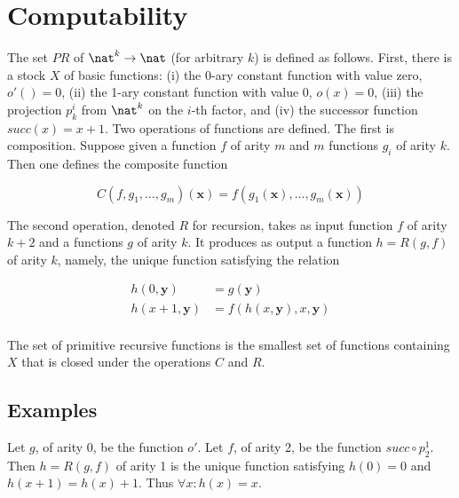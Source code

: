 
\section{Computability}

The set $PR$ of  $\nat^k \to \nat$ (for arbitrary $k$) is defined as follows.  First, there is a stock $X$ of basic functions: (i) the 0-ary constant function with value zero, $o'() = 0$, (ii) the 1-ary constant function with value 0, $o(x) = 0$, (iii) the projection $p^i_k$ from $\nat^k$ on the $i$-th factor, and (iv) the successor function $succ(x) = x + 1$.  Two operations of functions are defined. The first is composition.  Suppose given a function $f$ of arity $m$ and $m$ functions $g_i$ of arity $k$.  Then one defines the composite function


\begin{equation}
C(f,g_1,\ldots,g_m)(\mathbold{x}) = f(g_1(\mathbold{x}), \ldots, g_m(\mathbold{x}))
\end{equation}

The second operation, denoted $R$ for recursion, takes as input  function $f$ of arity $k+2$ and a functions $g$ of arity $k$.  It produces as output a function $h = R(g,f)$ of arity $k$, namely, the unique function satisfying the relation

\begin{align}
  h(0, \mathbold{y}) &= g(\mathbold{y}) \\
  h(x + 1, \mathbold{y}) &= f(h(x,\mathbold{y}), x, \mathbold{y}) \\
\end{align}

\begin{definition}
The set of primitive recursive functions is the smallest set of functions containing $X$ that is closed under the operations $C$ and $R$.
\end{definition}

\subsection{Examples}


  Let $g$, of arity 0, be the function $o'$. Let $f$, of arity 2, be the function $succ \circ p^1_2$.  Then $h = R(g,f)$ of arity 1 is the unique function satisfying $h(0) = 0$ and $h(x+1) = h(x) + 1$.  Thus $\forall x: h(x) = x$.

